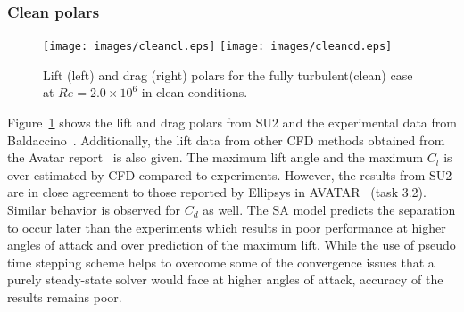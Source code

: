 \subsubsection{Clean polars}\label{ssec:clean}
\begin{figure}[h]
    \centering
    \captionsetup{justification=centering}
    \texttt{[image: images/cleancl.eps]}
    \texttt{[image: images/cleancd.eps]} 
    \caption{Lift (left) and drag (right) polars for the fully turbulent(clean) case at $Re=2.0\times10^6$ in clean conditions.}
   \label{fig:cleanpolar}
\end{figure}
Figure~\ref{fig:cleanpolar} shows the lift and drag polars from SU2 and the experimental data from Baldaccino~\cite{baldacchino2018experimental}. Additionally, the lift data from other CFD methods obtained from the Avatar report~\cite{Schepers_2018} is also given. The maximum lift angle and the maximum $C_l$ is over estimated by CFD compared to experiments. However, the results from SU2 are in close agreement to those reported by Ellipsys in AVATAR~\cite{Avatarwebsite} (task 3.2). Similar behavior is observed for $C_d$ as well. The SA model predicts the separation to occur later than the experiments which results in poor performance at higher angles of attack and over prediction of the maximum lift. While the use of pseudo time stepping scheme helps to overcome some of the convergence issues that a purely steady-state solver would face at higher angles of attack, accuracy of the results remains poor.

